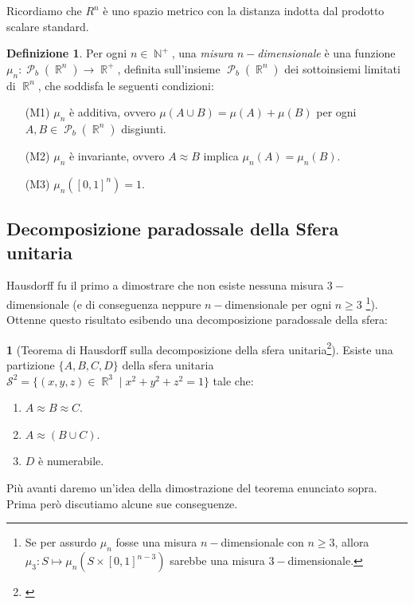 \documentclass[12pt,a4paper]{report}
\theoremstyle{definition}
\newtheorem{defn}[teo]{Definizione}  %
\theoremstyle{num.custom-title}
\newtheorem{teo_custom-title}[teo]{} %
\DeclareMathOperator{\PP}{\mathcal{P}}
\DeclareMathOperator{\N}{\mathbb{N}}
\DeclareMathOperator{\R}{\mathbb{R}}
\renewcommand{\S}{\mathcal{S}}
\begin{document}
Ricordiamo che $R^n$ è uno spazio metrico con la distanza indotta dal prodotto scalare standard.

\begin{defn}
Per ogni $n \in \N^+$, una \emph{misura $n-$dimensionale} è una funzione $\mu_n: \PP_b(\R^n) \to \R^+$, definita sull'insieme $\PP_b(\R^n)$ dei sottoinsiemi limitati di $\R^n$, che soddisfa le seguenti condizioni:
\begin{itemize}
\item[(M1)] $\mu_n$ è additiva, ovvero $\mu(A \cup B) = \mu(A) + \mu(B)$ per ogni $A,B \in \PP_b(\R^n)$ disgiunti.
\item[(M2)] $\mu_n$ è invariante, ovvero $A \approx B$ implica $\mu_n(A)=\mu_n(B)$.
\item[(M3)] $\mu_n([0,1]^n)=1$.
\end{itemize}
\end{defn}

\subsection{Decomposizione paradossale della Sfera unitaria}

Hausdorff fu il primo a dimostrare che non esiste nessuna misura $3-$dimensionale (e di conseguenza neppure $n-$dimensionale per ogni $n \geq 3$ \footnote{Se per assurdo $\mu_n$ fosse una misura $n-$dimensionale con $n \geq 3$, allora $\mu_3: S \mapsto \mu_n(S \times [0,1]^{n-3})$ sarebbe una misura $3-$dimensionale.}). Ottenne questo risultato esibendo una decomposizione paradossale della sfera:


\begin{teo_custom-title}[Teorema di Hausdorff sulla decomposizione della sfera unitaria\footnote{\cite{Hau14:Herrlich}}]\label{teo_hau_sfera}
Esiste una partizione $\{A,B,C,D\}$ della sfera unitaria $\S^2=\{(x,y,z) \in \R^3 \mid x^2+y^2+z^2=1\}$ tale che:
\begin{enumerate}
\item $A \approx B \approx C$.
\item $A \approx (B \cup C)$.
\item $D$ è numerabile.
\end{enumerate}
\end{teo_custom-title}

Più avanti daremo un'idea della dimostrazione del teorema enunciato sopra. Prima però discutiamo alcune sue conseguenze.
\end{document}
